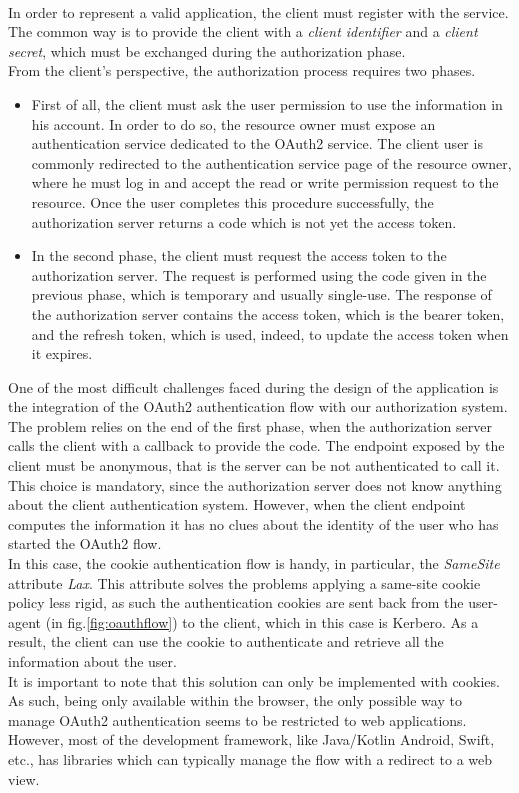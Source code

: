 \\ In order to represent a valid application, the client must register with the service. The common way is to provide the client with a \textit{client identifier} and a \textit{client secret}, which must be exchanged during the authorization phase. 
\\ From the client's perspective, the authorization process requires two phases.
\begin{itemize}
    \item First of all, the client must ask the user permission to use the information in his account. In order to do so, the resource owner must expose an authentication service dedicated to the OAuth2 service. The client user is commonly redirected to the authentication service page of the resource owner, where he must log in and accept the read or write permission request to the resource. Once the user completes this procedure successfully, the authorization server returns a code which is not yet the access token.
    \item In the second phase, the client must request the access token to the authorization server. The request is performed using the code given in the previous phase, which is temporary and usually single-use. The response of the authorization server contains the access token, which is the bearer token, and the refresh token, which is used, indeed, to update the access token when it expires. 
\end{itemize}
One of the most difficult challenges faced during the design of the application is the integration of the OAuth2 authentication flow with our authorization system. The problem relies on the end of the first phase, when the authorization server calls the client with a callback to provide the code. The endpoint exposed by the client must be anonymous, that is the server can be not authenticated to call it.
This choice is mandatory, since the authorization server does not know anything about the client authentication system. However, when the client endpoint computes the information it has no clues about the identity of the user who has started the OAuth2 flow. 
\\ In this case, the cookie authentication flow is handy, in particular, the \textit{SameSite} attribute \textit{Lax}. This attribute solves the problems applying a same-site cookie policy less rigid, as such the authentication cookies are sent back from the user-agent (in fig.\ref{fig:oauthflow}) to the client, which in this case is Kerbero. As a result, the client can use the cookie to authenticate and retrieve all the information about the user. 
\\ It is important to note that this solution can only be implemented with cookies. As such, being only available within the browser, the only possible way to manage OAuth2 authentication seems to be restricted to web applications. However, most of the development framework, like Java/Kotlin Android, Swift, etc., has libraries which can typically manage the flow with a redirect to a web view.

